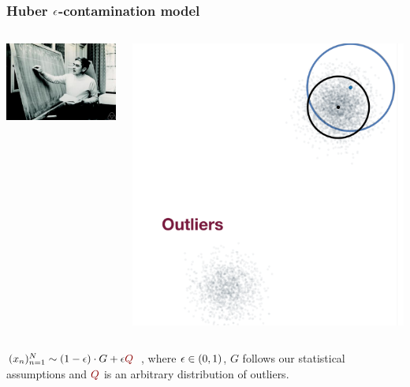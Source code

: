 \documentclass[hyperref={colorlinks = true},unknownkeysallowed]{beamer}
\let\oldcitep=\citep
\renewcommand\citep[1]{\hypersetup{linkcolor=UBCblue}\hyperlink{#1}{\oldcitep{#1}}}
\begin{document}
\begin{frame}
	\frametitle{Huber $\epsilon$-contamination model}
	\begin{columns}
		\begin{column}{.39\textwidth}
			\hfill \includegraphics[width=1.\textwidth]{figs/Huber.jpg}\\ 
		\end{column}
		\begin{column}{.69\textwidth}
			\hfill \includegraphics[width=.5\textwidth]{figs/contaminated-gaussian.png}\\ 
		\end{column}
	\end{columns}
	$(x_n)_{n=1}^{N}\sim (1-\eps)\cdot G + \eps \color{darkred}{Q}$~\citep{huber92},
	where $\epsilon \in (0,1)$, $G$ follows our statistical assumptions and $\color{darkred}{Q}$ is an arbitrary distribution of outliers.
\end{frame}
\end{document}
